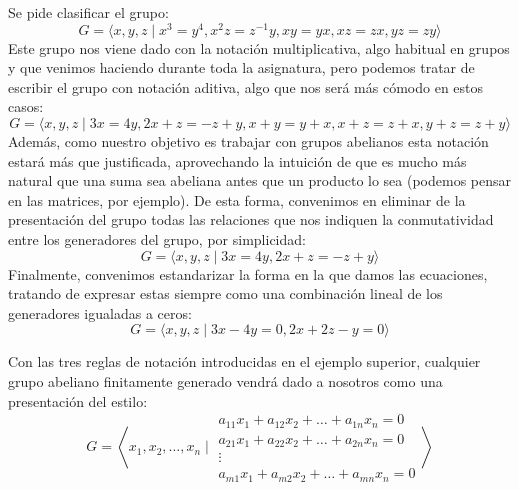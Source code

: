 \begin{ejemplo}
    Se pide clasificar el grupo:
    \begin{equation*}
        G = \langle x,y,z \mid x^3=y^4, x^2z = z^{-1}y, xy = yx, xz = zx, yz=zy \rangle 
    \end{equation*}
    Este grupo nos viene dado con la notación multiplicativa, algo habitual en grupos y que venimos haciendo durante toda la asignatura, pero podemos tratar de escribir el grupo con notación aditiva, algo que nos será más cómodo en estos casos:
    \begin{equation*}
        G = \langle x,y,z \mid 3x=4y, 2x+z = -z+y, x+y=y+x, x+z=z+x, y+z=z+y \rangle 
    \end{equation*}
    Además, como nuestro objetivo es trabajar con grupos abelianos esta notación estará más que justificada, aprovechando la intuición de que es mucho más natural que una suma sea abeliana antes que un producto lo sea (podemos pensar en las matrices, por ejemplo). De esta forma, convenimos en eliminar de la presentación del grupo todas las relaciones que nos indiquen la conmutatividad entre los generadores del grupo, por simplicidad:
    \begin{equation*}
        G = \langle x,y,z \mid 3x=4y, 2x+z=-z+y \rangle 
    \end{equation*}
    Finalmente, convenimos estandarizar la forma en la que damos las ecuaciones, tratando de expresar estas siempre como una combinación lineal de los generadores igualadas a ceros:
    \begin{equation*}
        G = \langle x,y,z \mid 3x-4y = 0, 2x+2z-y = 0 \rangle 
    \end{equation*}
\end{ejemplo}

Con las tres reglas de notación introducidas en el ejemplo superior, cualquier grupo abeliano finitamente generado vendrá dado a nosotros como una presentación del estilo:
\begin{equation*}
    G = \left\langle x_1,x_2,\ldots,x_n \mid \begin{array}{c}
        a_{11}x_1 + a_{12}x_2 + \ldots + a_{1n}x_n = 0 \\
        a_{21}x_1 + a_{22}x_2 + \ldots + a_{2n}x_n = 0 \\
        \vdots \\
        a_{m1}x_1 + a_{m2}x_2 + \ldots + a_{mn}x_n = 0
    \end{array}\right\rangle 
\end{equation*}

